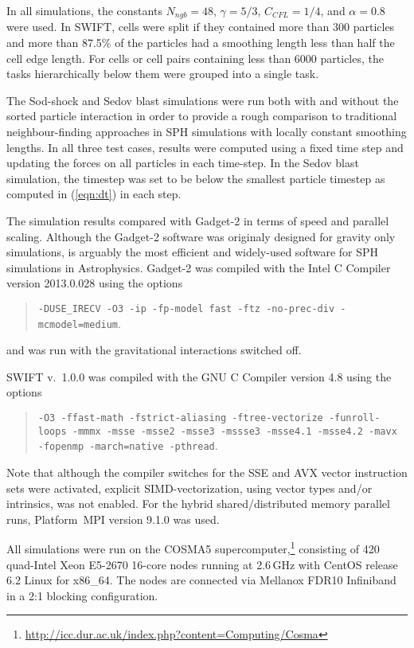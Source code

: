 \documentclass[final]{siamltex}
\newcommand{\eqn}[1]
    {(\ref{eqn:#1})}
\begin{document}
In all simulations, the constants $N_{ngb}=48$, $\gamma=5/3$,
$C_{CFL}=1/4$, and $\alpha = 0.8$ were used.
In SWIFT, cells were split if they contained more than 300
particles and more than 87.5\% of the particles had a smoothing
length less than half the cell edge length.
For cells or cell pairs containing less than 6000 particles, the
tasks hierarchically below them were grouped into a single task.

The Sod-shock and Sedov blast simulations were run both with and without the
sorted particle interaction in order to provide a rough comparison
to traditional neighbour-finding approaches in SPH simulations with
locally constant smoothing lengths.
In all three test cases, results were
computed using a fixed time step and updating the forces on all
particles in each time-step.
In the Sedov blast simulation, the timestep was set to be below
the smallest particle timestep as computed in \eqn{dt}
in each step.

The simulation results compared with Gadget-2 \cite{ref:Springel2005}
in terms of  speed and parallel scaling.
Although the Gadget-2 software was originaly designed for gravity only
simulations, is arguably the most efficient and widely-used software
for SPH simulations in Astrophysics.
Gadget-2 was compiled with the Intel C Compiler version 2013.0.028
using the options 
\begin{quote}{\tt -DUSE\_IRECV -O3 -ip -fp-model fast -ftz
-no-prec-div -mcmodel=medium}.\end{quote}
and was run with the gravitational interactions switched off.

SWIFT v.~1.0.0 was compiled with the GNU C Compiler version 4.8
using the options
\begin{quote}{\tt -O3 -ffast-math -fstrict-aliasing
-ftree-vectorize -funroll-loops -mmmx -msse -msse2 -msse3 -mssse3
-msse4.1 -msse4.2 -mavx -fopenmp -march=native -pthread}.\end{quote}
Note that although the compiler switches for the SSE and AVX
vector instruction sets were activated, explicit
SIMD-vectorization, using vector types and/or intrinsics, was not enabled.
For the hybrid shared/distributed memory parallel runs,
Platform~MPI version 9.1.0 was used.

All simulations were run on the COSMA5 supercomputer,\footnote{\url{http://icc.dur.ac.uk/index.php?content=Computing/Cosma}}
consisting of 420 quad-Intel Xeon E5-2670
16-core nodes running at 2.6\,GHz with CentOS release 6.2 Linux
for x86\_64.
The nodes are connected
via Mellanox FDR10 Infiniband in a 2:1 blocking configuration.
\end{document}
